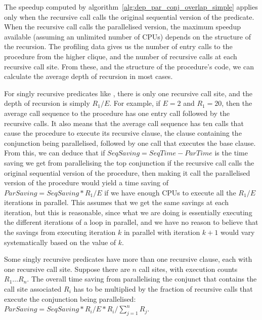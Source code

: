 {%

The speedup computed by algorithm~\ref{alg:dep_par_conj_overlap_simple}
applies only when the recursive call
calls the original sequential version of the predicate.
When the recursive call calls the parallelised version,
the maximum speedup available (assuming an unlimited number of CPUs)
depends on the structure of the recursion.
The profiling data gives us 
the number of entry calls to the procedure from the higher clique,
and  the number of recursive calls at each recursive call site.
From these, and the structure of the procedure's code,
we can calculate the average depth of recursion in most cases.

For singly recursive predicates like \mapfoldl,
there is only one recursive call site,
and the depth of recursion is simply $R_1/E$.
For example, if $E = 2$ and $R_1 = 20$,
then the average call sequence to the procedure
has one entry call followed by the recursive calls.
It also means that the average call sequence
has ten calls that cause the procedure to execute its recursive clause,
the clause containing the conjunction being parallelised,
followed by one call that executes the base clause.
From this, we can deduce that if ${SeqSaving} = {SeqTime} - {ParTime}$
is the time saving we get from parallelising the top conjunction
if the recursive call calls the original sequential version of the procedure,
then making it call the parallelised version of the procedure
would yield a time saving of ${ParSaving} = {SeqSaving} * R_1/E$
if we have enough CPUs to execute all the $R_1/E$ iterations in parallel.
This assumes that we get the same savings at each iteration,
but this is reasonable,
since what we are doing is essentially executing
the different iterations of a loop in parallel,
and we have no reason to believe that the savings
from executing iteration $k$ in parallel with iteration $k+1$
would vary systematically based on the value of $k$.

Some singly recursive predicates have more than one recursive clause,
each with one recursive call site.
Suppose there are $n$ call sites, with execution counts $R_1 \ldots R_n$.
The overall time saving from parallelising the conjunct
that contains the call site associated $R_i$
has to be multiplied by the fraction of recursive calls
that execute the conjunction being parallelised:
${ParSaving} = {SeqSaving} * R_i/E * R_i/\sum_{j=1}^n R_j$.

}
